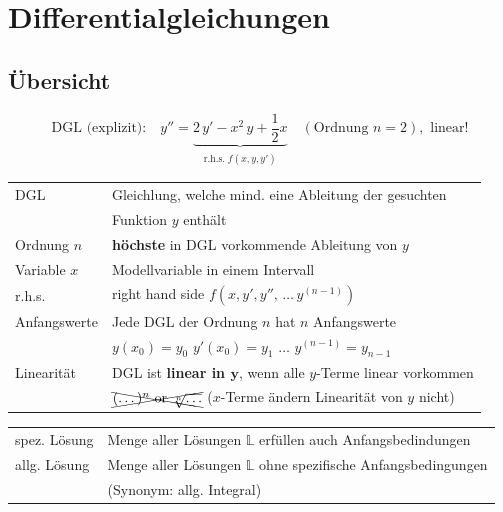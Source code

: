 \section{Differentialgleichungen}

\subsection{Übersicht}

\vspace{-0.2cm}

$$ \text{DGL (explizit):} \quad y'' = \underbrace{2 \, y' - x^2 \, y + \frac{1}{2}x}_{\substack{\text{r.h.s.} \; f(x, y, y')}}
    \quad (\text{Ordnung } n = 2), \text{ linear!} $$

\begin{tabular}{ll}
    DGL             & Gleichlung, welche mind. eine Ableitung der gesuchten                             \\
    \smallskip
                    & Funktion $y$ enthält                                                              \\
    \smallskip
    Ordnung $n$     & \textbf{höchste} in DGL vorkommende Ableitung von $y$                             \\
    \smallskip
    Variable $x$    & Modellvariable in einem Intervall                                                 \\
    \smallskip
    r.h.s.          & right hand side \quad $f(x, y', y'', \, \ldots \, y^{(n-1)} )$                    \\
    \smallskip
    Anfangswerte    & Jede DGL der Ordnung $n$ hat $n$ Anfangswerte                                     \\
    \smallskip
                    & $y(x_0) = y_0$ \quad $y'(x_0) = y_1$  \quad $\ldots$ \quad  $y^{(n-1)} = y_{n-1}$ \\
    Linearität      & DGL ist \textbf{linear in $\bm{y}$}, wenn alle $y$-Terme linear vorkommen         \\
                    & $\xcancel{(\dots)^n \text{ or } \sqrt[n]{\dots}}$ \qquad ($x$-Terme ändern Linearität von $y$ nicht) 
\end{tabular}

\medskip

\begin{tabular}{ll}
    \smallskip
    spez. Lösung    & Menge aller Lösungen   $\mathbb{L}$ erfüllen auch Anfangsbedindungen  \\
    allg. Lösung    & Menge aller Lösungen $\mathbb{L}$ ohne spezifische Anfangsbedingungen \\	
                    & (Synonym: allg. Integral) 
\end{tabular}


